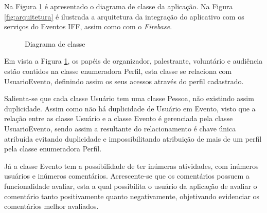 Na Figura \ref{fig:classe} é apresentado o diagrama de classe da aplicação. Na Figura \ref{fig:arquitetura} é ilustrada a arquitetura da integração do aplicativo com os serviços do Eventos IFF, assim como com o \textit{Firebase}.

\begin{figure}[H]
    \centering
    \caption{Diagrama de classe}
    \label{fig:classe}
\end{figure}

Em vista a Figura \ref{fig:classe}, os papéis de organizador, palestrante, voluntário e audiência estão contidos na classe enumeradora Perfil, esta classe se relaciona com UsuarioEvento, definindo assim os seus acessos através do perfil cadastrado.

Salienta-se que cada classe Usuário tem uma classe Pessoa, não existindo assim duplicidade. Assim como não há duplicidade de Usuário em Evento, visto que a relação entre as classe Usuário e a classe Evento é gerenciada pela classe UsuarioEvento, sendo assim a resultante do relacionamento é chave única atribuída evitando duplicidade e impossibilitando atribuição de mais de um perfil pela classe enumeradora Perfil.

Já a classe Evento tem a possibilidade de ter inúmeras atividades, com inúmeros usuários e inúmeros comentários. Acrescente-se que os comentários possuem a funcionalidade avaliar, esta a qual possibilita o usuário da aplicação de avaliar o comentário tanto positivamente quanto negativamente, objetivando evidenciar os comentários melhor avaliados.

